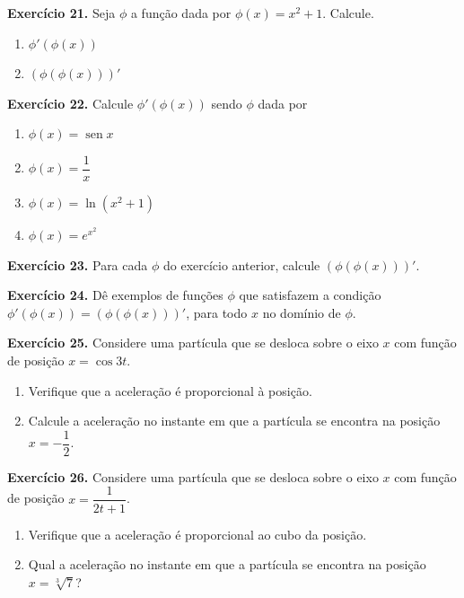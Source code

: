\documentclass[12pt,a4paper]{article}
\begin{document}
\vspace{0.5cm}
\noindent\textbf{Exercício 21.} Seja $\phi$ a função dada por $\phi(x) = x^2 + 1$. Calcule.
\begin{enumerate}
    \renewcommand{\theenumi}{\alph{enumi}}
    \renewcommand{\labelenumi}{\theenumi)}
    \item $\phi'(\phi(x))$
    \item $(\phi(\phi(x)))'$
\end{enumerate}

\vspace{0.5cm}
\noindent\textbf{Exercício 22.} Calcule $\phi'(\phi(x))$ sendo $\phi$ dada por
\begin{enumerate}
    \renewcommand{\theenumi}{\alph{enumi}}
    \renewcommand{\labelenumi}{\theenumi)}
    \item $\phi(x) = \operatorname{sen} x$
    \item $\phi(x) = \dfrac{1}{x}$
    \item $\phi(x) = \ln(x^2 + 1)$
    \item $\phi(x) = e^{x^2}$
\end{enumerate}

\vspace{0.5cm}
\noindent\textbf{Exercício 23.}
Para cada $\phi$ do exercício anterior, calcule $(\phi(\phi(x)))'$.

\vspace{0.5cm}
\noindent\textbf{Exercício 24.}
Dê exemplos de funções $\phi$ que satisfazem a condição $\phi'(\phi(x)) = (\phi(\phi(x)))'$, para todo $x$ no domínio de $\phi$.

\vspace{0.5cm}
\noindent\textbf{Exercício 25.} Considere uma partícula que se desloca sobre o eixo $x$ com função de posição $x = \cos 3t$.
\begin{enumerate}
    \renewcommand{\theenumi}{\alph{enumi}}
    \renewcommand{\labelenumi}{\theenumi)}
    \item Verifique que a aceleração é proporcional à posição.
    \item Calcule a aceleração no instante em que a partícula se encontra na posição $x = -\dfrac{1}{2}$.
\end{enumerate}

\vspace{0.5cm}
\noindent\textbf{Exercício 26.} Considere uma partícula que se desloca sobre o eixo $x$ com função de posição $x = \dfrac{1}{2t + 1}$.
\begin{enumerate}
    \renewcommand{\theenumi}{\alph{enumi}}
    \renewcommand{\labelenumi}{\theenumi)}
    \item Verifique que a aceleração é proporcional ao cubo da posição.
    \item Qual a aceleração no instante em que a partícula se encontra na posição $x = \sqrt[3]{7}$?
\end{enumerate}
\end{document}

